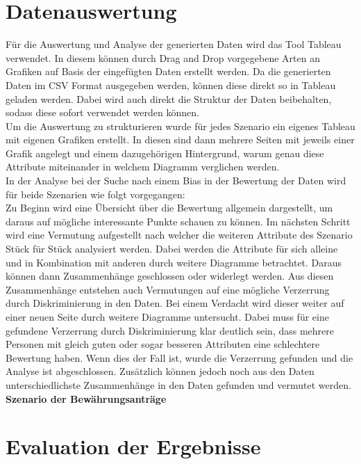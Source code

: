 \begin{onehalfspace}
\section{Datenauswertung}
\label{datenauswerung}
Für die Auswertung und Analyse der generierten Daten wird das Tool Tableau verwendet. In diesem können durch Drag and Drop vorgegebene Arten an Grafiken auf Basis der eingefügten Daten erstellt werden. Da die generierten Daten im CSV Format ausgegeben werden, können diese direkt so in Tableau geladen werden. Dabei wird auch direkt die Struktur der Daten beibehalten, sodass diese sofort verwendet werden können.\\
Um die Auswertung zu strukturieren wurde für jedes Szenario ein eigenes Tableau mit eigenen Grafiken erstellt. In diesen sind dann mehrere Seiten mit jeweils einer Grafik angelegt und einem dazugehörigen Hintergrund, warum genau diese Attribute miteinander in welchem Diagramm verglichen werden.\\
In der Analyse bei der Suche nach einem Bias in der Bewertung der Daten wird für beide Szenarien wie folgt vorgegangen:\\
Zu Beginn wird eine Übersicht über die Bewertung allgemein dargestellt, um daraus auf mögliche interessante Punkte schauen zu können. Im nächsten Schritt wird eine Vermutung aufgestellt nach welcher die weiteren Attribute des Szenario Stück für Stück analysiert werden. Dabei werden die Attribute für sich alleine und in Kombination mit anderen durch weitere Diagramme betrachtet. Daraus können dann Zusammenhänge geschlossen oder widerlegt werden. Aus diesen Zusammenhänge entstehen auch Vermutungen auf eine mögliche Verzerrung durch Diskriminierung in den Daten. Bei einem Verdacht wird dieser weiter auf einer neuen Seite durch weitere Diagramme untersucht. Dabei muss für eine gefundene Verzerrung durch Diskriminierung klar deutlich sein, dass mehrere Personen mit gleich guten oder sogar besseren Attributen eine schlechtere Bewertung haben. Wenn dies der Fall ist, wurde die Verzerrung gefunden und die Analyse ist abgeschlossen. Zusätzlich können jedoch noch aus den Daten unterschiedlichste Zusammenhänge in den Daten gefunden und vermutet werden.
\textbf{Szenario der Bewährungsanträge}\\

\section{Evaluation der Ergebnisse}
\label{evaluation}
\end{onehalfspace}
